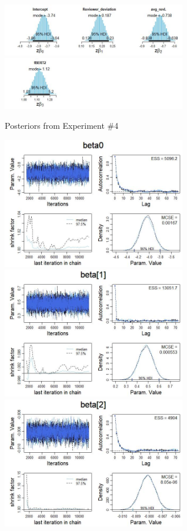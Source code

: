 \begin{figure}
\includegraphics[width=8cm]{posteriors_bdata_03.jpg}
\includegraphics[width=8cm]{pposteriors_bdata_03.jpg}
\caption{Posteriors from Experiment \#4}
\label{Exp4}
\end{figure}

\begin{figure}
\includegraphics[width=8cm]{Intercept_exp4.jpg}
\includegraphics[width=8cm]{ReviewerDevExp4.jpg} \\
\includegraphics[width=8cm]{AvgRevLenExp4.jpg}

\end{figure}

